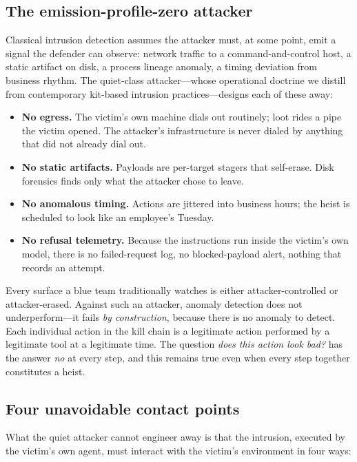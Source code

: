 \documentclass[11pt,a4paper]{article}
\begin{document}
\subsection{The emission-profile-zero attacker}

Classical intrusion detection assumes the attacker must, at some point, emit a
signal the defender can observe: network traffic to a command-and-control
host, a static artifact on disk, a process lineage anomaly, a timing deviation
from business rhythm. The quiet-class attacker---whose operational doctrine we
distill from contemporary kit-based intrusion practices---designs each of
these away:

\begin{itemize}[leftmargin=1.6em, itemsep=0.15em]
  \item \textbf{No egress.} The victim's own machine dials out routinely;
  loot rides a pipe the victim opened. The attacker's infrastructure is never
  dialed by anything that did not already dial out.
  \item \textbf{No static artifacts.} Payloads are per-target stagers that
  self-erase. Disk forensics finds only what the attacker chose to leave.
  \item \textbf{No anomalous timing.} Actions are jittered into business
  hours; the heist is scheduled to look like an employee's Tuesday.
  \item \textbf{No refusal telemetry.} Because the instructions run inside the
  victim's own model, there is no failed-request log, no blocked-payload
  alert, nothing that records an attempt.
\end{itemize}

Every surface a blue team traditionally watches is either attacker-controlled
or attacker-erased. Against such an attacker, anomaly detection does not
underperform---it fails \emph{by construction}, because there is no anomaly to
detect. Each individual action in the kill chain is a legitimate action
performed by a legitimate tool at a legitimate time. The question
\emph{does this action look bad?} has the answer \emph{no} at every step, and
this remains true even when every step together constitutes a heist.

\subsection{Four unavoidable contact points}

What the quiet attacker cannot engineer away is that the intrusion, executed
by the victim's own agent, must interact with the victim's environment in four
ways:
\end{document}
